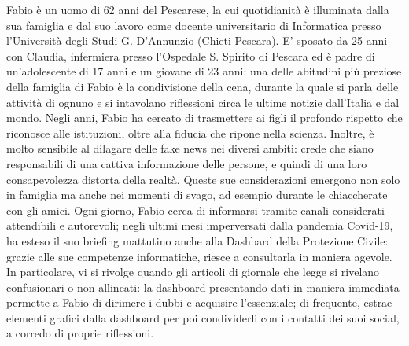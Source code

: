 Fabio è un uomo di 62 anni del Pescarese, la cui quotidianità è illuminata dalla sua famiglia e dal suo lavoro come docente universitario di Informatica presso l'Università degli Studi G. D'Annunzio (Chieti-Pescara).
E' sposato da 25 anni con Claudia, infermiera presso l'Ospedale S. Spirito di Pescara ed è padre di un'adolescente di 17 anni e un giovane di 23 anni: una delle abitudini più preziose della famiglia di Fabio è la condivisione della cena, durante la quale si parla delle attività di ognuno e si intavolano riflessioni circa le ultime notizie dall'Italia e dal mondo.
Negli anni, Fabio ha cercato di trasmettere ai figli il profondo rispetto che riconosce alle istituzioni, oltre alla fiducia che ripone nella scienza. Inoltre, è molto sensibile al dilagare delle fake news nei diversi ambiti: crede che siano responsabili di una cattiva informazione delle persone, e quindi di una loro consapevolezza distorta della realtà. 
Queste sue considerazioni emergono non solo in famiglia ma anche nei momenti di svago, ad esempio durante le chiaccherate con gli amici.
Ogni giorno, Fabio cerca di informarsi tramite canali considerati attendibili e autorevoli; negli ultimi mesi imperversati dalla pandemia Covid-19, ha esteso il suo briefing mattutino anche alla Dashbard della Protezione Civile: grazie alle sue competenze informatiche, riesce a consultarla in maniera agevole. In particolare, vi si rivolge quando gli articoli di giornale che legge si rivelano confusionari o non allineati: la dashboard presentando dati in maniera immediata permette a Fabio di dirimere i dubbi e acquisire l'essenziale; di frequente, estrae elementi grafici dalla dashboard per poi condividerli con i contatti dei suoi social, a corredo di proprie riflessioni.


